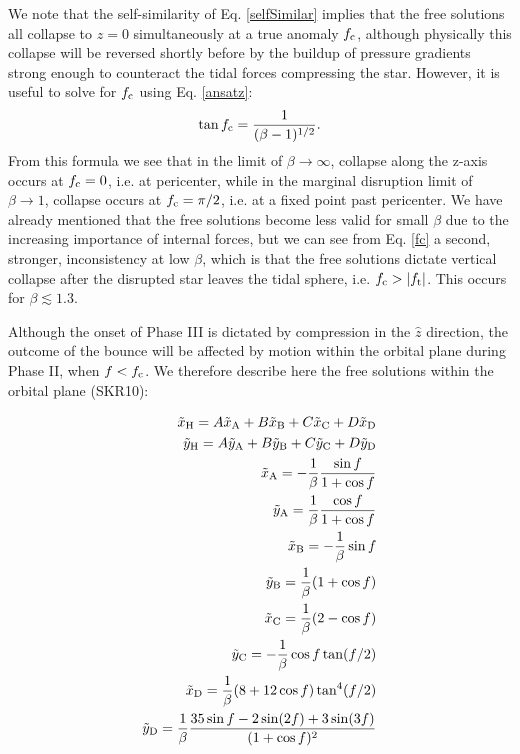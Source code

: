 \documentclass[useAMS, twocolumn, usenatbib]{mn2e}
\begin{document}
We note that the self-similarity of Eq. \ref{selfSimilar} implies that the free solutions all collapse to $z=0$ simultaneously at a true anomaly $f_{\rm c}$, although physically this collapse will be reversed shortly before by the buildup of pressure gradients strong enough to counteract the tidal forces compressing the star.  However, it is useful to solve for $f_{\rm c}$ using Eq. \ref{ansatz}:
\begin{equation}
\tan f_{\rm c} = \frac{1}{(\beta-1)^{1/2}}. \label{fc}
\end{equation}
From this formula we see that in the limit of $\beta \to \infty$, collapse along the z-axis occurs at $f_{\rm c}=0$, i.e. at pericenter, while in the marginal disruption limit of $\beta \to 1$, collapse occurs at $f_{\rm c}=\pi /2$, i.e. at a fixed point past pericenter.  We have already mentioned that the free solutions become less valid for small $\beta$ due to the increasing importance of internal forces, but we can see from Eq. \ref{fc} a second, stronger, inconsistency at low $\beta$, which  is that the free solutions dictate vertical collapse after the disrupted star leaves the tidal sphere, i.e. $f_{\rm c}>|f_{\rm t}|$.  This occurs for $\beta \lesssim 1.3$.

Although the onset of Phase III is dictated by compression in the $\hat{z}$ direction, the outcome of the bounce will be affected by motion within the orbital plane during Phase II, when $f<f_{\rm c}$.  We therefore describe here the free solutions within the orbital plane (SKR10):

\begin{align}
\tilde{x}_{\rm H}=A\tilde{x}_{\rm A}+B\tilde{x}_{\rm B}+C\tilde{x}_{\rm C}+D\tilde{x}_{\rm D} \notag \\
\tilde{y}_{\rm H}=A\tilde{y}_{\rm A}+B\tilde{y}_{\rm B}+C\tilde{y}_{\rm C}+D\tilde{y}_{\rm D} \notag \\
\tilde{x}_{\rm A}=-\frac{1}{\beta}\frac{\sin{f}}{1+\cos{f}} \notag \\
\tilde{y}_{\rm A}=\frac{1}{\beta}\frac{\cos{f}}{1+\cos{f}} \notag \\
\tilde{x}_{\rm B}=-\frac{1}{\beta}\sin{f} \notag \\
\tilde{y}_{\rm B}=\frac{1}{\beta}(1+\cos{f})\label{xyFreeSols}  \\
\tilde{x}_{\rm C}=\frac{1}{\beta}(2-\cos{f}) \notag \\
\tilde{y}_{\rm C}=-\frac{1}{\beta}\cos{f}\tan(f/2) \notag \\
\tilde{x}_{\rm D}=\frac{1}{\beta}(8+12\cos{f})\tan^4(f/2) \notag \\ 
\tilde{y}_{\rm D}=\frac{1}{\beta}\frac{35\sin{f}-2\sin(2f)+3\sin(3f)}{(1+\cos{f})^2} \notag
\end{align}
\end{document}
